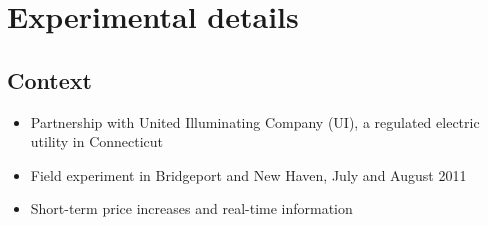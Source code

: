 \documentclass[12pt]{article}
\begin{document}
\section{Experimental details}
\subsection{Context}
\begin{itemize}
    \item Partnership with United Illuminating Company (UI), a regulated electric utility in Connecticut
    \item Field experiment in Bridgeport and New Haven, July and August 2011
    \item Short-term price increases and real-time information
\end{itemize}
\end{document}
